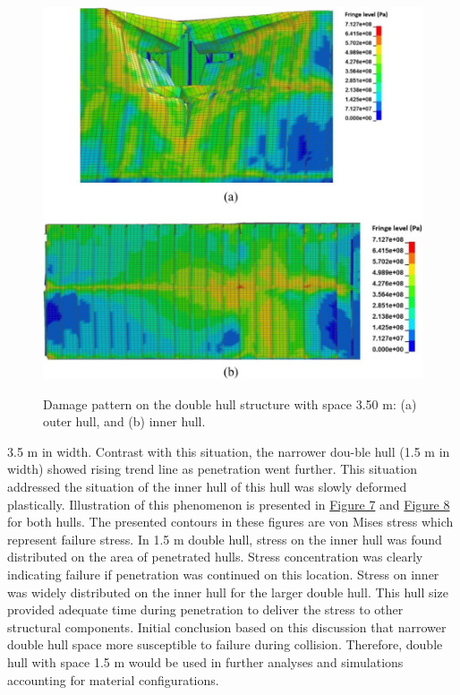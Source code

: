 \documentclass[../Final.tex]{subfiles}
\begin{document}
\begin{figure}[ht]
    \centering
    \includegraphics[width=\columnwidth]{fig8.jpg}
    \label{fig8}
    \caption{Damage pattern on the double hull structure with space 3.50 m: (a) outer hull, and (b) inner hull.}
\end{figure}

3.5 m in width. Contrast with this situation, the narrower dou-ble hull (1.5 m in width) showed rising trend line as penetration went further. 
This situation addressed the situation of the inner hull of this hull was slowly deformed plastically. Illustration of this phenomenon is presented in \hyperref[fig7]{Figure 7} and \hyperref[fig8]{Figure 8} for both hulls. 
The presented contours in these figures are von Mises stress which represent failure stress. In 1.5 m double hull, stress on the inner hull was found distributed on the area of penetrated hulls. 
Stress concentration was clearly indicating failure if pen­etration was continued on this location. 
Stress on inner was widely distributed on the inner hull for the larger double hull. This hull size provided adequate time during penetration to deliver the stress to other structural components. 
Initial conclusion based on this discussion that narrower double hull space more susceptible to failure during collision. 
Therefore, double hull with space 1.5 m would be used in further analyses and simulations accounting for material configurations. 
\end{document}
